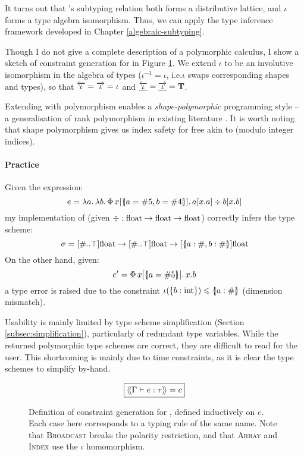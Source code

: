 It turns out that \starr{}'s subtyping relation both forms a distributive lattice, and $\iota$ forms a type algebra isomorphism.
Thus, we can apply the type inference framework developed in Chapter \ref{algebraic-subtyping}. 

Though I do not give a complete description of a polymorphic \starr{} calculus, I show a sketch of constraint generation for \starr{} in Figure \ref{fig:star-type-constraints}. We extend $\iota$ to be an involutive isomorphism in the algebra of types ($\iota^{-1} = \iota$, i.e.\@ $\iota$ swaps corresponding shapes and types), so that $\overleftarrow{\iota} = \overrightarrow{\iota} = \iota$ and $\underline{\overleftarrow{\iota}} = \underline{\overrightarrow{\iota}} = \mathbf T$.

Extending \starr{} with polymorphism enables a \emph{shape-polymorphic} programming style -- a generalisation of rank polymorphism in existing literature \cite{automap, sac-tensor-comprehensions}. 
It is worth noting that shape polymorphism gives us index safety for free akin to \textcite{theorems-for-free} (modulo integer indices).

\paragraph{Practice} Given the expression:
$$ e = \fllam a \fllam b \sbuild{x}{\sproductval{a = \ssize 5, b = \ssize 4}}{a[x{.}a] \div b[x{.}b]} $$
my implementation of \inference{} (given $\div : \mathrm{float} \to \mathrm{float} \to \mathrm{float}$) correctly infers the type scheme:
$$ \sigma = \sarraytype{\ssized}{\top}{\sfloat} \to \sarraytype{\ssized}{\top}{\sfloat} \to \suniarraytype{\sproducttype{a : \ssized, b : \ssized}}{\sfloat} $$
On the other hand, given:
$$ e' = \sbuild{x}{\sproductval{a = \ssize 5}}{x.{b}} $$
a type error is raised due to the constraint $\iota(\srecordtype{b : \sint}) \sub \sproducttype{a : \ssized}$ (dimension mismatch).

Usability is mainly limited by type scheme simplification (Section \ref{subsec:simplification}), particularly of redundant type variables. While the returned polymorphic type schemes are correct, they are difficult to read for the user. This shortcoming is mainly due to time constraints, as it is clear the type schemes to simplify by-hand.


\begin{figure}
    \centering
    \addtolength{\jot}{0.2em}
    $$ \boxed{\cstr{\Gamma}{e}{\tau} = c} $$
    
    \caption{Definition of \inference{} constraint generation for \starr{}, defined inductively on $e$. Each case here corresponds to a typing rule of the same name. Note that \textsc{Broadcast} breaks the polarity restriction, and that \textsc{Array} and \textsc{Index} use the $\iota$ homomorphism.}
    \label{fig:star-type-constraints}
\end{figure}

